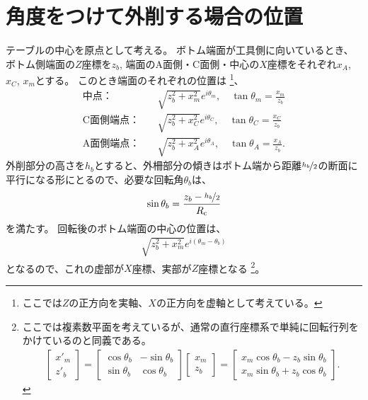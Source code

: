 \clearpage
\section{角度をつけて外削する場合の位置}
テーブルの中心を原点として考える。
ボトム端面が工具側に向いているとき、ボトム側端面の$Z$座標を$z_b$, 端面のA面側・C面側・中心の$X$座標をそれぞれ$x_A$, $x_C$, $x_m$とする。
このとき端面のそれぞれの位置は
\footnote{ここでは$Z$の正方向を実軸、$X$の正方向を虚軸として考えている。}、
\begin{subequations}
\begin{align*}
  \text{中点：}&\quad \sqrt{z_b^2+x_m^2}e^{i\theta_m}, \quad \tan\theta_m = \frac{x_m}{z_b}\\
  \text{C面側端点：}&\quad \sqrt{z_b^2+x_C^2}e^{i\theta_C}, \quad \tan\theta_C = \frac{x_C}{z_b}\\
  \text{A面側端点：}&\quad \sqrt{z_b^2+x_A^2}e^{i\theta_A}, \quad \tan\theta_A = \frac{x_A}{z_b}.
\end{align*}
\end{subequations}
外削部分の高さを$h_b$とすると、外柵部分の傾きはボトム端から距離$\nicefrac{h_b}2$の断面に平行になる形にとるので、必要な回転角$\theta_b$は、
\begin{align*}
  \sin\theta_b = \frac{z_b-\nicefrac{h_b}2}{R_\text c}
\end{align*}
を満たす。
回転後のボトム端面の中心の位置は、
\begin{align*}
  \sqrt{z_b^2+x_m^2}e^{i(\theta_m-\theta_b)}
\end{align*}
となるので、これの虚部が$X$座標、実部が$Z$座標となる
\footnote{ここでは複素数平面を考えているが、通常の直行座標系で単純に回転行列をかけているのと同義である。
\begin{align*}
  \left[
    \begin{array}{c}
      x'_m\\
      z'_b
    \end{array}
  \right]
  = \left[
    \begin{array}{cc}
      \cos\theta_b & -\sin\theta_b\\
      \sin\theta_b & \cos\theta_b
    \end{array}
  \right]\!\!
  \left[
    \begin{array}{c}
      x_m\\
      z_b
    \end{array}
  \right]
  = \left[
    \begin{array}{c}
      x_m\cos\theta_b-z_b\sin\theta_b\\
      x_m\sin\theta_b+z_b\cos\theta_b
    \end{array}
  \right].
\end{align*}}。
